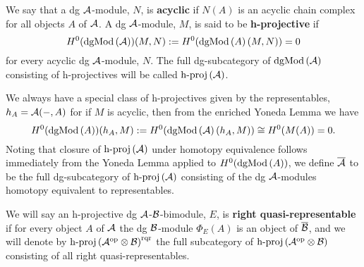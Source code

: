 We say that a dg \(\mathcal{A}\)-module, \(N\), is \textbf{acyclic} if \(N(A)\) is an acyclic chain complex for all objects \(A\) of \(\mathcal{A}\).
A dg \(\mathcal{A}\)-module, \(M\), is said to be \textbf{h-projective} if
\[H^0(\operatorname{dgMod}\left(\mathcal{A}\right))(M,N) := H^0(\operatorname{dgMod}\left(A\right)(M,N)) = 0\]
for every acyclic dg \(\mathcal{A}\)-module, \(N\).
The full dg-subcategory of \(\operatorname{dgMod}\left(\mathcal{A}\right)\) consisting of h-projectives will be called \(\operatorname{h-proj}\left(\mathcal{A}\right)\).

We always have a special class of h-projectives given by the representables, \(h_A = \mathcal{A}(-, A)\) for if \(M\) is acyclic, then from the enriched Yoneda Lemma we have
\[H^0(\operatorname{dgMod}\left(A\right))(h_A,M) := H^0(\operatorname{dgMod}\left(\mathcal{A}\right)(h_A, M)) \cong H^0(M(A)) = 0.\]
Noting that closure of \(\operatorname{h-proj}\left(\mathcal{A}\right)\) under homotopy equivalence follows immediately from the Yoneda Lemma applied to \(H^0(\operatorname{dgMod}\left(A\right))\), we define \(\overline{\mathcal{A}}\) to be the full dg-subcategory of \(\operatorname{h-proj}\left(\mathcal{A}\right)\) consisting of the dg \(\mathcal{A}\)-modules homotopy equivalent to representables.

We will say an h-projective dg \(\mathcal{A}\)-\(\mathcal{B}\)-bimodule, \(E\), is \textbf{right quasi-representable} if for every object \(A\) of \(\mathcal{A}\) the dg \(\mathcal{B}\)-module \(\Phi_E(A)\) is an object of \(\overline{\mathcal{B}}\), and we will denote by \(\operatorname{h-proj}\left(\mathcal{A}^{\operatorname{op}} \otimes \mathcal{B}\right)^{\operatorname{rqr}}\) the full subcategory of \(\operatorname{h-proj}\left(\mathcal{A}^{\operatorname{op}} \otimes \mathcal{B}\right)\) consisting of all right quasi-representables.

